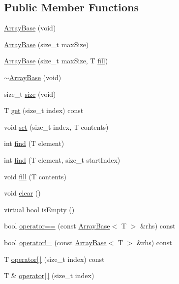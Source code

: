 \subsection*{Public Member Functions}
\begin{DoxyCompactItemize}
\item 
\hyperlink{a00001_a949fbe49f202aed7d4ce8442b7fd0bd5}{Array\+Base} (void)
\item 
\hyperlink{a00001_af9db2c439a3c5bc723c66d44ba4049a0}{Array\+Base} (size\+\_\+t max\+Size)
\item 
\hyperlink{a00001_a5de8eae891c4d4f855a6739fc573de85}{Array\+Base} (size\+\_\+t max\+Size, T \hyperlink{a00001_a6becc5e91c79d7693c0d406e466f9ec6}{fill})
\item 
\hyperlink{a00001_a76eb6a2544ace5a6c8cc972b876b60a0}{$\sim$\+Array\+Base} (void)
\item 
size\+\_\+t \hyperlink{a00001_aeed263e1e987901c8cc2c1e1d3102d73}{size} (void)
\item 
T \hyperlink{a00001_aabda9501caf50b75ce09e7ef47fd1de7}{get} (size\+\_\+t index) const 
\item 
void \hyperlink{a00001_a5a9fe61509061defe530d0ebc3a91497}{set} (size\+\_\+t index, T contents)
\item 
int \hyperlink{a00001_adc718f38281ba844303941c4d111cc8c}{find} (T element)
\item 
int \hyperlink{a00001_a450ec98ae75a13f7dfbd6ba499218b8e}{find} (T element, size\+\_\+t start\+Index)
\item 
void \hyperlink{a00001_a6becc5e91c79d7693c0d406e466f9ec6}{fill} (T contents)
\item 
void \hyperlink{a00001_a11dc3b617f2fedbb3b499971493b9c4f}{clear} ()
\item 
virtual bool \hyperlink{a00001_a1687635b3bda64e9064e53b8d5a91ac1}{is\+Empty} ()
\item 
bool \hyperlink{a00001_a95a446bcd6e8b2ff10e6f5c0232e6069}{operator==} (const \hyperlink{a00001}{Array\+Base}$<$ T $>$ \&rhs) const 
\item 
bool \hyperlink{a00001_acb1f14f8761d00708f25281854bf0769}{operator!=} (const \hyperlink{a00001}{Array\+Base}$<$ T $>$ \&rhs) const 
\item 
T \hyperlink{a00001_a654b9073ee55e973fc31a9c03affe423}{operator\mbox{[}$\,$\mbox{]}} (size\+\_\+t index) const 
\item 
T \& \hyperlink{a00001_a38d83584b9e023781779af9dd733d822}{operator\mbox{[}$\,$\mbox{]}} (size\+\_\+t index)
\end{DoxyCompactItemize}


